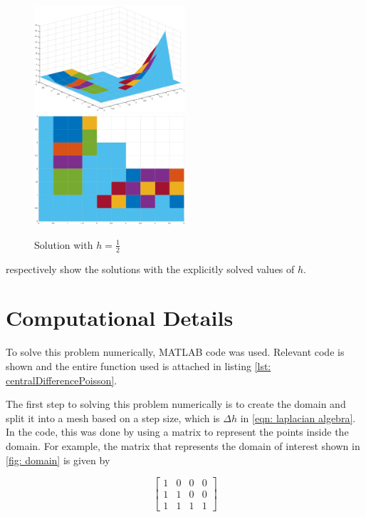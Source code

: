 \documentclass[10pt,a4paper]{article}
\begin{document}
 \begin{figure}[H]
	 \includegraphics[width=0.5\textwidth]{figures/explicit-h12.eps}
	 \includegraphics[width=0.5\textwidth]{figures/explicit-h12-top.eps}
	 \caption{Solution with $h=\frac{1}{2}$}
\label{fig: explicit12plot}
 \end{figure}

  respectively show the solutions with the explicitly solved values of $h$.

\section*{Computational Details}
To solve this problem numerically, MATLAB code was used. Relevant code is shown and the entire function used is attached in listing \ref{lst: centralDifferencePoisson}.

The first step to solving this problem numerically is to create the domain and split it into a mesh based on a step size, which is $\Delta h$ in \cref{eqn: laplacian algebra}. In the code, this was done by using a matrix to represent the points inside the domain. For example, the matrix that represents the domain of interest shown in \cref{fig: domain} is given by

\begin{displaymath}
\left[
\begin{matrix}
1 & 0 & 0 & 0 \\
1 & 1 & 0 & 0 \\
1 & 1 & 1 & 1 
\end{matrix}
\right]
\end{displaymath}
\end{document}
